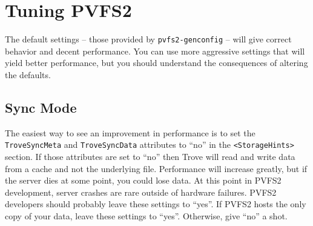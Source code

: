 \section{Tuning PVFS2}
\label{sec:tuning}

The default settings -- those provided by \texttt{pvfs2-genconfig} --
will give correct behavior and decent performance.   You can use more
aggressive settings that will yield better performance, but you should
understand the consequences of altering the defaults.

\subsection{Sync Mode}

The easiest way to see an improvement in performance is to set the
\texttt{TroveSyncMeta} and \texttt{TroveSyncData} attributes to ``no''
in the \texttt{<StorageHints>} section.  If those attributes are set to
``no'' then Trove will read and write data from a cache and not the
underlying file.  Performance will increase greatly, but if the server
dies at some point, you could lose data.  At this point in PVFS2
development, server crashes are rare outside of hardware failures.
PVFS2 developers should probably leave these settings to ``yes''.  If
PVFS2 hosts the only copy of your data, leave these settings to ``yes''.
Otherwise, give ``no'' a shot.
